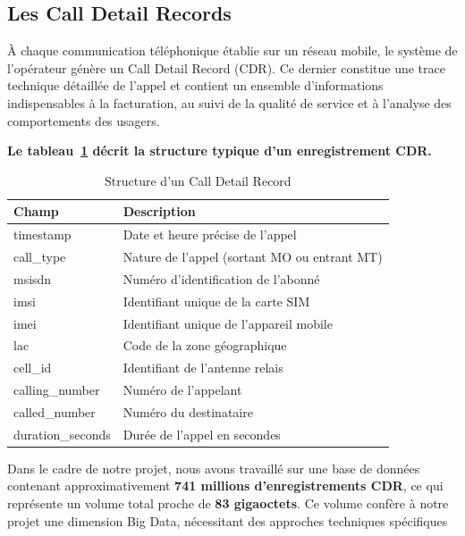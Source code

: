 \documentclass[12pt, oneside, a4paper]{report}
\begin{document}
\subsection{Les Call Detail Records}

À chaque communication téléphonique établie sur un réseau mobile, le système de l’opérateur génère un Call Detail Record (CDR). Ce dernier constitue une trace technique détaillée de l’appel et contient un ensemble d’informations indispensables à la facturation, au suivi de la qualité de service et à l’analyse des comportements des usagers.

\textbf{Le tableau~\ref{tab:cdr-structure} décrit la structure typique d’un enregistrement CDR.}

\begin{table}[h!]
\centering
\caption{Structure d'un Call Detail Record}
\label{tab:cdr-structure}
\vspace{0.3cm}
\renewcommand{\arraystretch}{1.3}
\begin{tabular}{|l|l|}
\hline
\textbf{Champ} & \textbf{Description} \\
\hline
timestamp & Date et heure précise de l'appel \\
\hline
call\_type & Nature de l'appel (sortant MO ou entrant MT) \\
\hline
msisdn & Numéro d'identification de l'abonné \\
\hline
imsi & Identifiant unique de la carte SIM \\
\hline
imei & Identifiant unique de l'appareil mobile \\
\hline
lac & Code de la zone géographique \\
\hline
cell\_id & Identifiant de l'antenne relais \\
\hline
calling\_number & Numéro de l'appelant \\
\hline
called\_number & Numéro du destinataire \\
\hline
duration\_seconds & Durée de l'appel en secondes \\
\hline
\end{tabular}
\end{table}


Dans le cadre de notre projet, nous avons travaillé sur une base de données contenant approximativement \textbf{741 millions d’enregistrements CDR}, ce qui représente un volume total proche de\textbf{ 83 gigaoctets}. Ce volume confère à notre projet une dimension Big Data, nécessitant des approches techniques spécifiques
\end{document}
